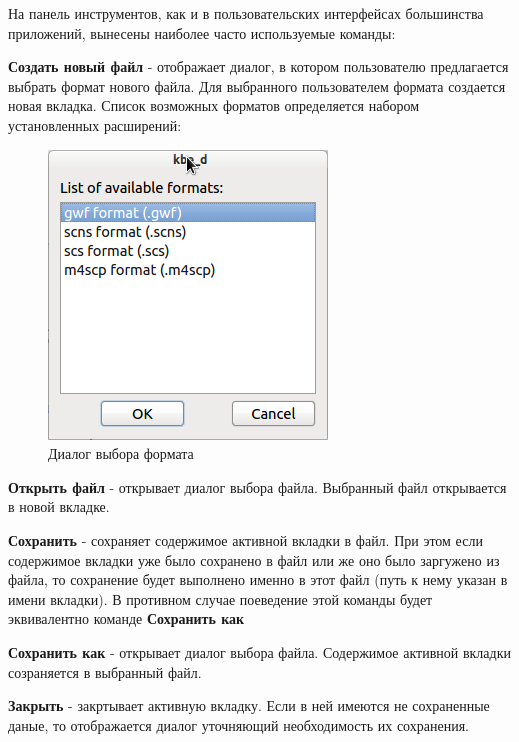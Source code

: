 На панель инструментов, как и в пользовательских интерфейсах большинства приложений, вынесены наиболее часто используемые команды:
\begin{list}{•}{}
	\item \textbf{Создать новый файл} - отображает диалог, в котором пользователю предлагается выбрать формат нового файла.
	Для выбранного пользователем формата создается новая вкладка. Список возможных форматов определяется набором установленных расширений:
	
	\begin{figure}[h]
		\begin{center}
			\includegraphics[scale=0.7]{../images/new_dialog.png}
		\end{center}
		\caption{Диалог выбора формата}
		\label{pic_new_dialog}
	\end{figure}
	
	
	\item \textbf{Открыть файл} - открывает диалог выбора файла. Выбранный файл открывается в новой вкладке.
	\item \textbf{Сохранить} - сохраняет содержимое активной вкладки в файл. При этом если содержимое вкладки 
	уже было сохранено в файл или же оно было заргужено из файла, то сохранение будет выполнено именно в этот файл (путь к нему указан в имени вкладки).
	В противном случае поеведение этой команды будет эквивалентно команде \textbf{Сохранить как}
	\item \textbf{Сохранить как} - открывает диалог выбора файла. Содержимое активной вкладки созраняется в выбранный файл.
	\item \textbf{Закрыть} - закртывает активную вкладку. Если в ней имеются не сохраненные даные, то отображается диалог уточняющий необходимость
	их сохранения.
\end{list}


